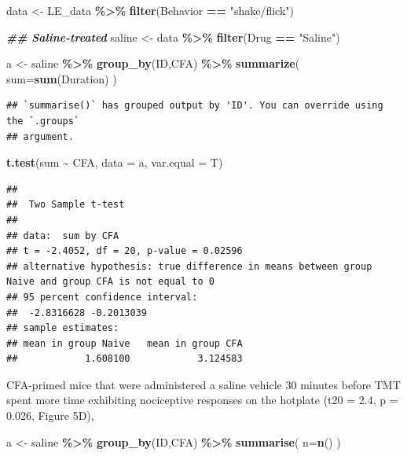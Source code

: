 \documentclass[
]{book}
\newenvironment{Shaded}{\begin{snugshade}}{\end{snugshade}}
\newcommand{\AttributeTok}[1]{\textcolor[rgb]{0.13,0.29,0.53}{#1}}
\newcommand{\DocumentationTok}[1]{\textcolor[rgb]{0.56,0.35,0.01}{\textbf{\textit{#1}}}}
\newcommand{\FunctionTok}[1]{\textcolor[rgb]{0.13,0.29,0.53}{\textbf{#1}}}
\newcommand{\NormalTok}[1]{#1}
\newcommand{\OtherTok}[1]{\textcolor[rgb]{0.56,0.35,0.01}{#1}}
\newcommand{\SpecialCharTok}[1]{\textcolor[rgb]{0.81,0.36,0.00}{\textbf{#1}}}
\newcommand{\StringTok}[1]{\textcolor[rgb]{0.31,0.60,0.02}{#1}}
\begin{document}
\begin{Shaded}
\begin{Highlighting}[]
\NormalTok{data }\OtherTok{\textless{}{-}}\NormalTok{ LE\_data }\SpecialCharTok{\%\textgreater{}\%}
  \FunctionTok{filter}\NormalTok{(Behavior }\SpecialCharTok{==} \StringTok{"shake/flick"}\NormalTok{) }

\DocumentationTok{\#\# Saline{-}treated}
\NormalTok{saline }\OtherTok{\textless{}{-}}\NormalTok{ data }\SpecialCharTok{\%\textgreater{}\%} 
  \FunctionTok{filter}\NormalTok{(Drug }\SpecialCharTok{==} \StringTok{"Saline"}\NormalTok{)}

\NormalTok{a }\OtherTok{\textless{}{-}}\NormalTok{ saline }\SpecialCharTok{\%\textgreater{}\%}
  \FunctionTok{group\_by}\NormalTok{(ID,CFA) }\SpecialCharTok{\%\textgreater{}\%}
  \FunctionTok{summarize}\NormalTok{(}
    \AttributeTok{sum=}\FunctionTok{sum}\NormalTok{(Duration)}
\NormalTok{  )}
\end{Highlighting}
\end{Shaded}

\begin{verbatim}
## `summarise()` has grouped output by 'ID'. You can override using the `.groups`
## argument.
\end{verbatim}

\begin{Shaded}
\begin{Highlighting}[]
\FunctionTok{t.test}\NormalTok{(sum }\SpecialCharTok{\textasciitilde{}}\NormalTok{ CFA, }\AttributeTok{data =}\NormalTok{ a, }\AttributeTok{var.equal =}\NormalTok{ T)}
\end{Highlighting}
\end{Shaded}

\begin{verbatim}
## 
##  Two Sample t-test
## 
## data:  sum by CFA
## t = -2.4052, df = 20, p-value = 0.02596
## alternative hypothesis: true difference in means between group Naive and group CFA is not equal to 0
## 95 percent confidence interval:
##  -2.8316628 -0.2013039
## sample estimates:
## mean in group Naive   mean in group CFA 
##            1.608100            3.124583
\end{verbatim}

CFA-primed mice that were administered a saline vehicle 30 minutes before TMT spent more time exhibiting nociceptive responses on the hotplate (t20 = 2.4, p = 0.026, Figure 5D),

\begin{Shaded}
\begin{Highlighting}[]
\NormalTok{a }\OtherTok{\textless{}{-}}\NormalTok{ saline }\SpecialCharTok{\%\textgreater{}\%}
  \FunctionTok{group\_by}\NormalTok{(ID,CFA) }\SpecialCharTok{\%\textgreater{}\%}
  \FunctionTok{summarise}\NormalTok{(}
    \AttributeTok{n=}\FunctionTok{n}\NormalTok{()}
\NormalTok{  )}
\end{Highlighting}
\end{Shaded}
\end{document}
